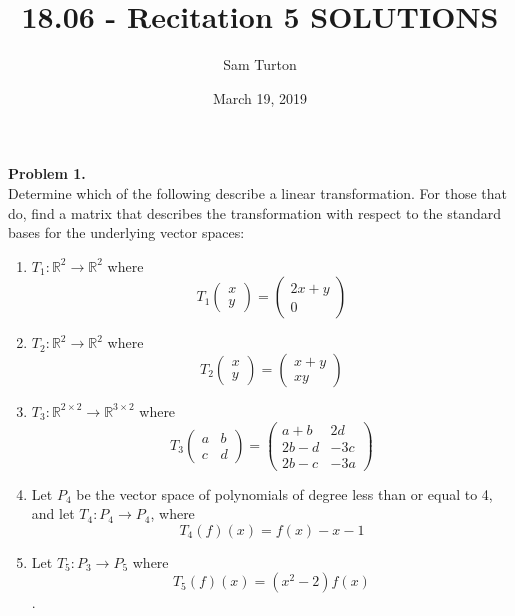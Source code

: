 \documentclass[11pt]{article}
\title{18.06 - Recitation 5 SOLUTIONS}
\author{Sam Turton}
\date{March 19, 2019}
\begin{document}
\maketitle


\noindent \textbf{Problem 1.}\\
Determine which of the following describe a linear transformation. For those that do, find a matrix that describes the transformation with respect to the standard bases for the underlying vector spaces:
\begin{enumerate}
\item $T_1:\mathbb{R}^2\to\mathbb{R}^2$ where
$$T_1\begin{pmatrix} x \\ y \end{pmatrix} = \begin{pmatrix} 2x+y \\ 0 \end{pmatrix}$$
\item $T_2:\mathbb{R}^2\to\mathbb{R}^2$ where
$$T_2\begin{pmatrix} x \\ y \end{pmatrix} = \begin{pmatrix} x+y \\ xy \end{pmatrix}$$
\item $T_3:\mathbb{R}^{2\times 2}\to \mathbb{R}^{3\times2}$ where
$$T_3\begin{pmatrix} a & b \\ c & d \end{pmatrix} = \begin{pmatrix} a+b & 2d \\ 2b-d & -3c \\ 2b-c & -3a \end{pmatrix}$$
\item Let $P_4$ be the vector space of polynomials of degree less than or equal to 4, and let $T_4 :P_4\to P_4$, where
$$T_4(f)(x) = f(x) - x - 1$$
\item Let $T_5 :P_3\to P_5$ where 
$$T_5(f)(x) = (x^2-2)f(x)$$. 
\end{enumerate}

\
\end{document}
